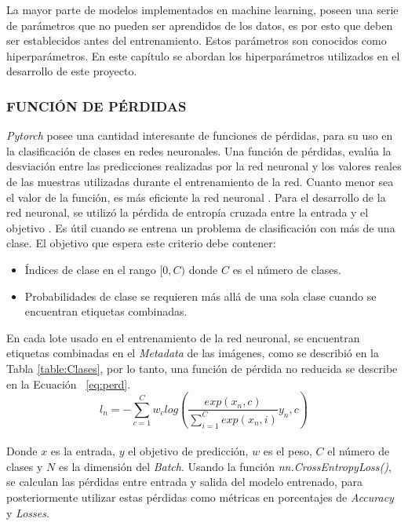 La mayor parte de modelos implementados en machine learning, poseen una serie de parámetros que no pueden ser aprendidos de los datos, es por esto que deben ser establecidos antes del entrenamiento. Estos parámetros son conocidos como hiperparámetros. En este capítulo se abordan los hiperparámetros utilizados en el desarrollo de este proyecto.

\subsubsection{FUNCIÓN DE PÉRDIDAS}		

\textit{Pytorch} posee una cantidad interesante de funciones de pérdidas, para su uso en la clasificación de clases en redes neuronales. Una función de pérdidas, evalúa la desviación entre las predicciones realizadas por la red neuronal y los valores reales de las muestras utilizadas durante el entrenamiento de la red. Cuanto menor sea el valor de la función, es más eficiente la red neuronal \cite{mathivet2018inteligencia}. 	
Para el desarrollo de la red neuronal, se utilizó la pérdida de entropía cruzada entre la entrada y el objetivo \cite{Pytorch}. Es útil cuando se entrena un problema de clasificación con más de una clase.  El objetivo que espera este criterio debe contener:

\begin{itemize}
	\item Índices de clase en el rango $[0,C)$ donde $C$ es el número de clases.
	\item Probabilidades de clase se requieren más allá de una sola clase cuando se encuentran etiquetas combinadas.				 
\end{itemize}

En cada lote usado en el entrenamiento de la red neuronal, se encuentran etiquetas combinadas en el \textit{Metadata} de las imágenes, como se describió en la Tabla \ref{table:Clases}, por lo tanto, una función de pérdida no reducida \cite{Pytorch} se describe en la Ecuación ~\ref{eq:perd}.\\

\begin{equation}
	\label{eq:perd}
	{l_n=-\sum_{c=1}^{C}w_c log\left(\frac{exp(x_n,c)}{\sum_{i=1}^{C}exp(x_n,i)}y_n,c\right)}
\end{equation}\\

Donde $x$ es la entrada, $y$ el objetivo de predicción, $w$ es el peso, $C$ el número de clases y $N$ es la dimensión del \textit{Batch}. Usando la función \textit{nn.CrossEntropyLoss()}, se calculan las pérdidas entre entrada y salida del modelo entrenado, para posteriormente utilizar estas pérdidas como métricas en porcentajes de \textit{Accuracy} y \textit{Losses}.\\			

